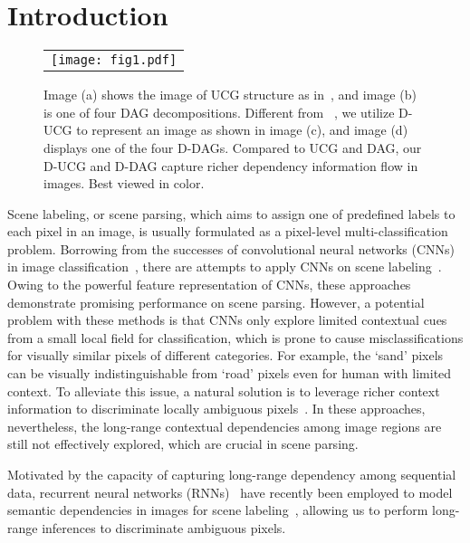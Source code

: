 \documentclass[10pt,twocolumn,letterpaper]{article}
\begin{document}
\section{Introduction}
\label{sec_intro}
\begin{figure}[!htb]
\centering
\begin{tabular}{c}
\texttt{[image: fig1.pdf]}\\
\end{tabular}
\caption{Image (a) shows the image of UCG structure as in~\cite{shuai2017scene}, and image (b) is one of four DAG decompositions. Different from ~\cite{shuai2017scene}, we utilize D-UCG to represent an image as shown in image (c), and image (d) displays one of the four D-DAGs. Compared to UCG and DAG, our D-UCG and D-DAG capture richer dependency information flow in images. Best viewed in color.}
\label{fig:fig1}
\end{figure}
Scene labeling, or scene parsing, which aims to assign one of predefined labels to each pixel in an image, is usually formulated as a pixel-level multi-classification problem. Borrowing from the successes of convolutional neural networks (CNNs)~\cite{lecun1989backpropagation} in image classification~\cite{krizhevsky2012imagenet,simonyan2014very,he2016deep}, there are attempts to apply CNNs on scene labeling~\cite{farabet2013learning,long2015fully,noh2015learning,badrinarayanan2015segnet,girshick2014rich}. Owing to the powerful feature representation of CNNs, these approaches demonstrate promising performance on scene parsing. However, a potential problem with these methods is that CNNs only explore limited contextual cues from a small local field for classification, which is prone to cause misclassifications for visually similar pixels of different
categories. For example, the `sand' pixels can be visually indistinguishable from `road' pixels even for human with limited context. To alleviate this issue, a natural solution is to leverage richer context information to discriminate locally ambiguous pixels~\cite{chen2016deeplab,yu2015multi,liu2015parsenet}. In these approaches, nevertheless, the long-range contextual dependencies among image regions are still not effectively explored, which are crucial in scene parsing.

Motivated by the capacity of capturing long-range dependency among sequential data, recurrent neural networks (RNNs)~\cite{elman1990finding} have recently been employed to model semantic dependencies in images for scene labeling~\cite{byeon2015scene,li2016lstm,shuai2017scene,liang2016semantic,visin2016reseg}, allowing us to perform long-range inferences to discriminate ambiguous pixels.
\end{document}
